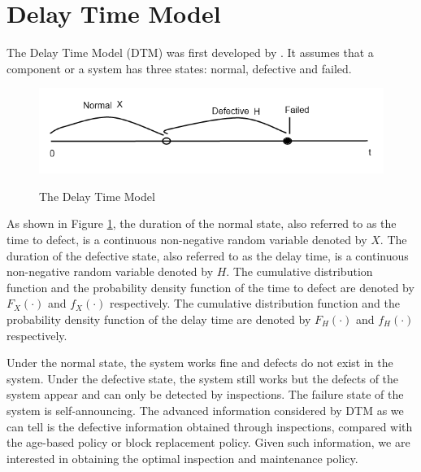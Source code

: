 \documentclass[10pt,a4paper]{article}
\theoremstyle{remark}
\begin{document}
\section{Delay Time Model}
The Delay Time Model (DTM) was first developed by \cite{ChristerWaller84}. It assumes that a component or a system has three states: normal, defective and failed. 
\begin{figure}[h!!!]  %
  \centering
  \includegraphics[width=6in]{DTM1.png}\\
  \footnotesize
  \caption{ \footnotesize{ The Delay Time Model} }\label{DTM1}
\end{figure}

As shown in Figure \ref{DTM1}, the duration of the normal state, also referred to as the time to defect, is a continuous non-negative random variable denoted by $X$. The duration of the defective state, also referred to as the delay time, is a continuous non-negative random variable denoted by $H$. The cumulative distribution function and the probability density function of the time to defect are denoted by $F_{X}(\cdot)$ and $f_{X}(\cdot)$ respectively. The cumulative distribution function and the probability density function of the delay time are denoted by $F_{H}(\cdot)$ and $f_{H}(\cdot)$ respectively. 

Under the normal state, the system works fine and defects do not exist in the system. Under the defective state, the system still works but the defects of the system appear and can only be detected by inspections. The failure state of the system is self-announcing. The advanced information considered by DTM as we can tell is the defective information obtained through inspections, compared with the age-based policy or block replacement policy. Given such information, we are interested in obtaining the optimal inspection and maintenance policy.
\end{document}
